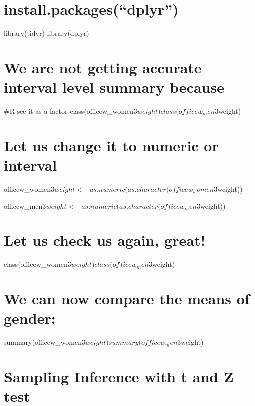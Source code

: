 \documentclass[
]{article}
\begin{document}
\hypertarget{install.packagesdplyr}{%
\section{install.packages(``dplyr'')}\label{install.packagesdplyr}}

library(tidyr) library(dplyr)

\hypertarget{we-are-not-getting-accurate-interval-level-summary-because}{%
\section{We are not getting accurate interval level summary
because}\label{we-are-not-getting-accurate-interval-level-summary-because}}

\#R see it as a factor
class(officew\_women3\(weight) class(officew_men3\)weight)

\hypertarget{let-us-change-it-to-numeric-or-interval}{%
\section{Let us change it to numeric or
interval}\label{let-us-change-it-to-numeric-or-interval}}

officew\_women3\(weight <-  as.numeric(as.character(officew_women3\)weight))

officew\_men3\(weight <-  as.numeric(as.character(officew_men3\)weight))

\hypertarget{let-us-check-us-again-great}{%
\section{Let us check us again,
great!}\label{let-us-check-us-again-great}}

class(officew\_women3\(weight) class(officew_men3\)weight)

\hypertarget{we-can-now-compare-the-means-of-gender}{%
\section{We can now compare the means of
gender:}\label{we-can-now-compare-the-means-of-gender}}

summary(officew\_women3\(weight) summary(officew_men3\)weight)

\hypertarget{sampling-inference-with-t-and-z-test}{%
\section{Sampling Inference with t and Z
test}\label{sampling-inference-with-t-and-z-test}}
\end{document}
